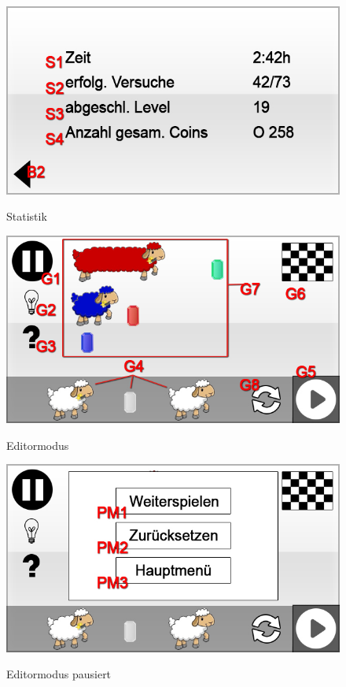 \begin{figure}[H]
\centering
{}\label{fig:Statistik}
\includegraphics[scale=0.55]{../gui/_jpeg_numeration/stat.jpg}
\caption{Statistik}
\end{figure}

\begin{figure}[H]
\centering
{}\label{fig:game}
\includegraphics[scale=0.55]{../gui/_jpeg_numeration/game.jpg}
\caption{Editormodus}
\end{figure}

\begin{figure}[H]
\centering
{}\label{fig:game_paused}
\includegraphics[scale=0.55]{../gui/_jpeg_numeration/game_paused.jpg}
\caption{Editormodus pausiert}
\end{figure}

